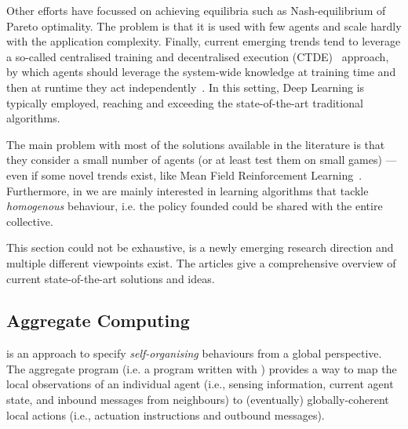 \documentclass[11pt]{article}
\begin{document}
Other efforts have focussed on achieving equilibria such as Nash-equilibrium of Pareto optimality.
The problem is that it is used with few agents and scale hardly with the application complexity.
%
Finally, current emerging trends tend to leverage a so-called centralised training and decentralised execution (CTDE)~\cite{DBLP:journals/tcyb/NguyenNN20} approach, by which 
 agents should leverage the system-wide knowledge at training time and then at runtime they act independently~\cite{DBLP:journals/aamas/Hernandez-LealK19}. In this setting, Deep Learning is typically employed, reaching and exceeding the state-of-the-art traditional \marl{} algorithms.
 
The main problem with most of the solutions available in the literature is that they consider a small number of agents (or at least test them on small games) --- even if some novel trends exist, like Mean Field Reinforcement Learning~\cite{DBLP:journals/corr/abs-2108-02731}.
Furthermore, in \cpsw{} we are mainly interested in learning algorithms that tackle \emph{homogenous} behaviour, i.e. the policy founded could be shared with the entire collective.

This section could not be exhaustive, \marl{} is a newly emerging research direction and multiple different viewpoints exist. The articles \cite{DBLP:journals/aamas/Hernandez-LealK19, DBLP:journals/corr/abs-1911-10635, DBLP:journals/corr/abs-1908-03963} give a comprehensive overview of current state-of-the-art solutions and ideas.
\subsection{Aggregate Computing}

\ac{} is an approach to specify \emph{self-organising} behaviours from a global perspective.
%
The aggregate program (i.e. a program written with \ac{}) provides a way to map the local observations of an individual agent (i.e., sensing information, current agent state, and inbound messages from neighbours) to (eventually) globally-coherent local actions
 (i.e., actuation instructions and outbound messages).
%
\end{document}
